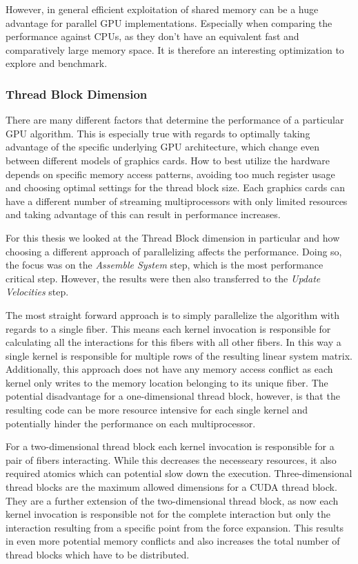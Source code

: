 \documentclass[a4paper,11pt]{kth-mag}
\begin{document}
However, in general efficient exploitation of shared memory can be a huge advantage for parallel GPU implementations. Especially when comparing the performance against CPUs, as they don't have an equivalent fast and comparatively large memory space. It is therefore an interesting optimization to explore and benchmark.

\subsubsection{Thread Block Dimension}

There are many different factors that determine the performance of a particular GPU algorithm. This is especially true with regards to optimally taking advantage of the specific underlying GPU architecture, which change even between different models of graphics cards. How to best utilize the hardware depends on specific memory access patterns, avoiding too much register usage and choosing optimal settings for the thread block size. Each graphics cards can have a different number of streaming multiprocessors with only limited resources and taking advantage of this can result in performance increases.

For this thesis we looked at the Thread Block dimension in particular and how choosing a different approach of parallelizing affects the performance. Doing so, the focus was on the \emph{Assemble System} step, which is the most performance critical step. However, the results were then also transferred to the \emph{Update Velocities} step.

The most straight forward approach is to simply parallelize the algorithm with regards to a single fiber. This means each kernel invocation is responsible for calculating all the interactions for this fibers with all other fibers. In this way a single kernel is responsible for multiple rows of the resulting linear system matrix. Additionally, this approach does not have any memory access conflict as each kernel only writes to the memory location belonging to its unique fiber. The potential disadvantage for a one-dimensional thread block, however, is that the resulting code can be more resource intensive for each single kernel and potentially hinder the performance on each multiprocessor.

For a two-dimensional thread block each kernel invocation is responsible for a pair of fibers interacting. While this decreases the necesseary resources, it also required atomics which can potential slow down the execution. Three-dimensional thread blocks are the maximum allowed dimensions for a CUDA thread block. They are a further extension of the two-dimensional thread block, as now each kernel invocation is responsible not for the complete interaction but only the interaction resulting from a specific point from the force expansion. This results in even more potential memory conflicts and also increases the total number of thread blocks which have to be distributed.
\end{document}
